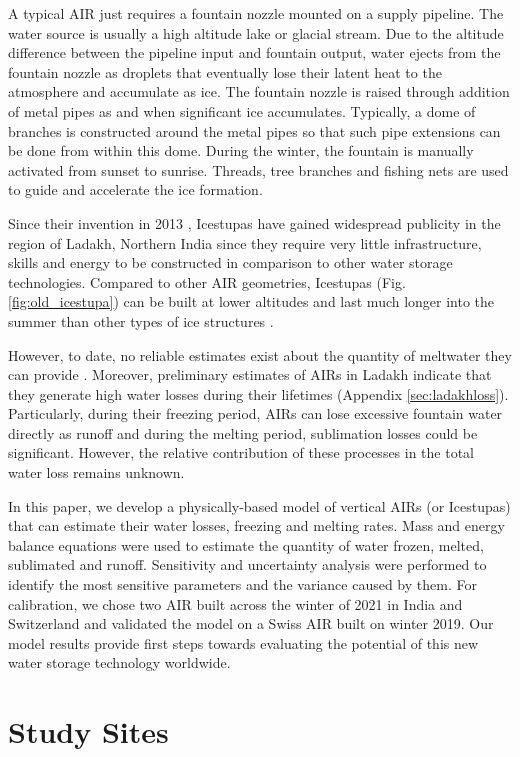 \documentclass[utf8]{frontiersSCNS} %
\begin{document}
A typical AIR just requires a fountain nozzle mounted on a supply pipeline. The water source is usually a high altitude
lake or glacial stream. Due to the altitude difference between the pipeline input and fountain output, water ejects from
the fountain nozzle as droplets that eventually lose their latent heat to the atmosphere and accumulate as ice. The
fountain nozzle is raised through addition of metal pipes as and when significant ice accumulates.  Typically, a dome of
branches is constructed around the metal pipes so that such pipe extensions can be done from within this dome. During
the winter, the fountain is manually activated from sunset to sunrise. Threads, tree branches and fishing nets are used
to guide and accelerate the ice formation.

Since their invention in 2013 \citep{campaign}, Icestupas have gained widespread publicity in the region of Ladakh,
Northern India since they require very little infrastructure, skills and energy to be constructed in comparison to other
water storage technologies. Compared to other AIR geometries, Icestupas (Fig. \ref{fig:old_icestupa}) can be built
at lower altitudes and last much longer into the summer than other types of ice structures \citep{campaign}.

However, to date, no reliable estimates exist about the quantity of meltwater they can provide \citep{Nusser_2018}
. Moreover, preliminary estimates of AIRs in Ladakh indicate that they generate high water losses during their lifetimes
(Appendix \ref{sec:ladakhloss}). Particularly, during their freezing period, AIRs can lose excessive fountain water
directly as runoff and during the melting period, sublimation losses could be significant.  However, the relative
contribution of these processes in the total water loss remains unknown.

In this paper, we develop a physically-based model of vertical AIRs (or Icestupas) that can estimate their water
losses, freezing and melting rates. Mass and energy balance equations were used to estimate the quantity of water
frozen, melted, sublimated and runoff. Sensitivity and uncertainty analysis were performed to identify the most
sensitive parameters and the variance caused by them. For calibration, we chose two AIR built across the winter of
2021 in India and Switzerland and validated the model on a Swiss AIR built on winter 2019. Our model results
provide first steps towards evaluating the potential of this new water storage technology worldwide.

\section{Study Sites}
\end{document}
